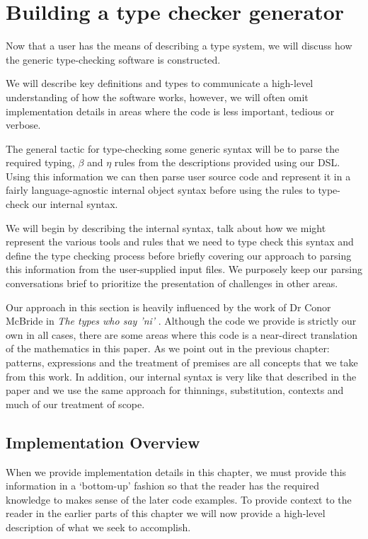 \chapter{Building a type checker generator}

Now that a user has the means of describing a type system, we will
discuss how the generic type-checking software is constructed.

We will describe key definitions and types to communicate a
high-level understanding of how the software works,
however, we will often omit implementation details in areas where the
code is less important, tedious or verbose.

The general tactic for type-checking some generic syntax will be to
parse the required typing, $\beta$ and $\eta$ rules from the
descriptions provided using our DSL. Using this information we can
then parse user source code and represent it in a fairly
language-agnostic internal object syntax before using the rules
to type-check our internal syntax.

We will begin by describing the internal syntax, talk about how we
might represent the various tools and rules that we need to
type check this syntax and define the type checking process before
briefly covering our approach to parsing this information from the
user-supplied input files. We purposely keep our parsing conversations
brief to prioritize the presentation of challenges in other areas.

Our approach in this section is heavily influenced by the work of
Dr Conor McBride in \emph{The types who say 'ni'} \cite{TypesWhoSayNi}.
Although the code we provide is strictly our own in all cases, there
are some areas where this code is a near-direct translation of
the mathematics in this paper. As we point out in the previous
chapter: patterns, expressions and the treatment of premises are
all concepts that we take from this work. In addition, our internal
syntax is very like that described in the paper and we use the same
approach for thinnings, substitution, contexts and much of our
treatment of scope.

\section{Implementation Overview}

When we provide implementation details in this chapter, we must
provide this information in a ‘bottom-up’ fashion so that the reader
has the required knowledge to makes sense of the later code
examples. To provide context to the reader in the earlier parts of
this chapter we will now provide a high-level description of what we
seek to accomplish. 

